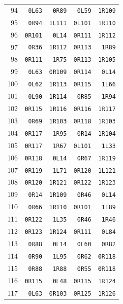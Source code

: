 \begin{longtable}{rrrrr}
94 & \texttt{0L63} & \texttt{0R89} & \texttt{0L59} & \texttt{1R109}\\
95 & \texttt{0R94} & \texttt{1L111} & \texttt{0L101} & \texttt{1R110}\\
96 & \texttt{0R101} & \texttt{0L14} & \texttt{0R111} & \texttt{1R112}\\
97 & \texttt{0R36} & \texttt{1R112} & \texttt{0R113} & \texttt{1R89}\\
98 & \texttt{0R111} & \texttt{1R75} & \texttt{0R113} & \texttt{1R105}\\
99 & \texttt{0L63} & \texttt{0R109} & \texttt{0R114} & \texttt{0L14}\\
100 & \texttt{0L62} & \texttt{1R113} & \texttt{0R115} & \texttt{1L66}\\
101 & \texttt{0L90} & \texttt{1R114} & \texttt{0R85} & \texttt{1R94}\\
102 & \texttt{0R115} & \texttt{1R116} & \texttt{0R116} & \texttt{1R117}\\
103 & \texttt{0R69} & \texttt{1R103} & \texttt{0R118} & \texttt{1R103}\\
104 & \texttt{0R117} & \texttt{1R95} & \texttt{0R14} & \texttt{1R104}\\
105 & \texttt{0R117} & \texttt{1R67} & \texttt{0L101} & \texttt{1L33}\\
106 & \texttt{0R118} & \texttt{0L14} & \texttt{0R67} & \texttt{1R119}\\
107 & \texttt{0R119} & \texttt{1L71} & \texttt{0R120} & \texttt{1L121}\\
108 & \texttt{0R120} & \texttt{1R121} & \texttt{0R122} & \texttt{1R123}\\
109 & \texttt{0R14} & \texttt{1R109} & \texttt{0R46} & \texttt{0L14}\\
110 & \texttt{0R66} & \texttt{1R110} & \texttt{0R101} & \texttt{1L89}\\
111 & \texttt{0R122} & \texttt{1L35} & \texttt{0R46} & \texttt{1R46}\\
112 & \texttt{0R123} & \texttt{1R124} & \texttt{0R111} & \texttt{0L84}\\
113 & \texttt{0R88} & \texttt{0L14} & \texttt{0L60} & \texttt{0R82}\\
114 & \texttt{0R90} & \texttt{1L95} & \texttt{0R62} & \texttt{0R118}\\
115 & \texttt{0R88} & \texttt{1R88} & \texttt{0R55} & \texttt{0R118}\\
116 & \texttt{0R115} & \texttt{0L48} & \texttt{0R115} & \texttt{1R124}\\
117 & \texttt{0L63} & \texttt{0R103} & \texttt{0R125} & \texttt{1R126}\\

\end{longtable}
